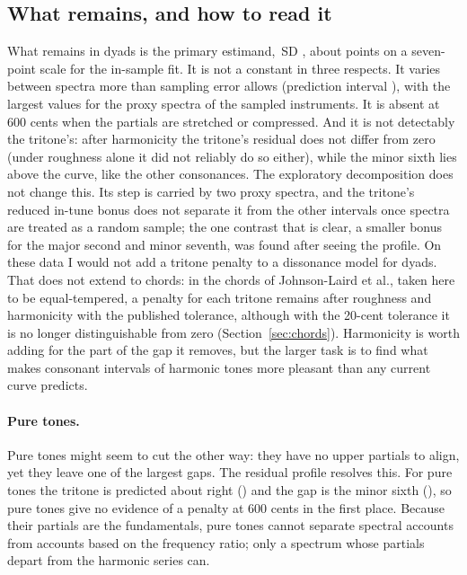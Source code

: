 \documentclass[11pt,a4paper]{article}
\newcommand{\SDu}{\,SD}
\begin{document}
\subsection{What remains, and how to read it}
\label{sec:discussion-remains}
What remains in dyads is the primary estimand, \primGap\SDu{} \primGapCI, about
\poolGapHKHHarmRaw{} points on a seven-point scale for the in-sample fit. It is not
a constant in three respects. It varies between spectra more than sampling error allows
(prediction interval \primGapPI), with the largest values for the proxy spectra of the
sampled instruments. It is absent at 600 cents when the partials are stretched or
compressed. And it is not detectably the tritone's: after harmonicity the tritone's residual does not
differ from zero (under roughness alone it did not reliably do so either), while the minor
sixth lies above the curve, like the other consonances. The exploratory decomposition does not
change this. Its step is carried by two proxy spectra, and the tritone's reduced in-tune bonus
does not separate it from the other intervals once spectra are treated as a random sample; the
one contrast that is clear, a smaller bonus for the major second and minor seventh, was found
after seeing the profile. On these data I would not add a tritone penalty to a dissonance model for dyads. That does
not extend to chords: in the chords of Johnson-Laird et al., taken here to be equal-tempered, a penalty for each
tritone remains after roughness and harmonicity with the published tolerance, although with
the 20-cent tolerance it is no longer distinguishable from zero
(Section~\ref{sec:chords}). Harmonicity is worth adding for the part of the gap it removes,
but the larger task is to find what makes consonant intervals of harmonic tones more pleasant
than any current curve predicts.

\paragraph{Pure tones.}
Pure tones might seem to cut the other way: they have no upper partials to align, yet they
leave one of the largest gaps. The residual profile resolves this. For pure tones the tritone
is predicted about right (\rpfPureTwSix) and the gap is the minor sixth (\rpfPureTwEight), so
pure tones give no evidence of a penalty at 600 cents in the first place. Because their
partials are the fundamentals, pure tones cannot separate spectral accounts from accounts
based on the frequency ratio; only a spectrum whose partials depart from the harmonic series
can.
\end{document}
